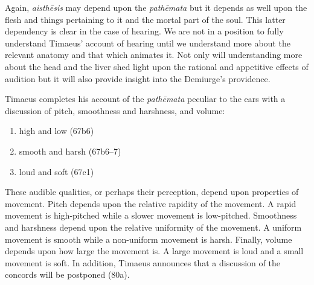 Again, \emph{aisthēsis} may depend upon the \emph{pathēmata} but it depends as well upon the flesh and things pertaining to it and the mortal part of the soul. This latter dependency is clear in the case of hearing. We are not in a position to fully understand Timaeus' account of hearing until we understand more about the relevant anatomy and that which animates it. Not only will understanding more about the head and the liver shed light upon the rational and appetitive effects of audition but it will also provide insight into the Demiurge's providence.

Timaeus completes his account of the \emph{pathēmata} peculiar to the ears with a discussion of pitch, smoothness and harshness, and volume:
\begin{enumerate}[(2)]
	\item high and low (67b6)
	\item smooth and harsh (67b6--7)
	\item loud and soft (67c1)
\end{enumerate}
These audible qualities, or perhaps their perception, depend upon properties of movement. Pitch depends upon the relative rapidity of the movement. A rapid movement is high-pitched while a slower movement is low-pitched. Smoothness and harshness depend upon the relative uniformity of the movement. A uniform movement is smooth while a non-uniform movement is harsh. Finally, volume depends upon how large the movement is. A large movement is loud and a small movement is soft. In addition, Timaeus announces that a discussion of the concords will be postponed (80a).

